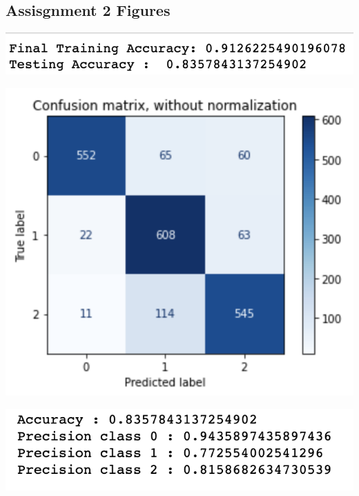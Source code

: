 \documentclass[12pt]{article}
\begin{document}
\begin{multicols*}{2}
  \subsection{Assisgnment 2 Figures} 
  \begin{center}
		\includegraphics[scale=0.5]{../screenshot/Rf-Overlapping012/score.png}

		\includegraphics[scale=0.5]{../screenshot/Rf-Overlapping012/cf.png}

		\includegraphics[scale=0.5]{../screenshot/Rf-Overlapping012/calc_result.png}
  \end{center}


\end{multicols*}
\end{document}
